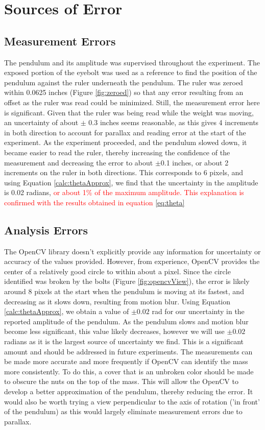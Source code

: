 \documentclass[11pt]{article}
\begin{document}
    \section{Sources of Error}        
        \subsection{Measurement Errors}\label{SourcesOfError:MeasurementErrors}
        The pendulum and its amplitude was supervised throughout the experiment. The exposed portion of the eyebolt was used as a reference to find the position of the pendulum against the ruler underneath the pendulum. The ruler was zeroed within 0.0625 inches (Figure \ref{fig:zeroed}) so that any error resulting from an offset as the ruler was read could be minimized. Still, the measurement error here is significant. Given that the ruler was being read while the weight was moving, an uncertainty of about $\pm$ 0.3 inches seems reasonable, as this gives 4 increments in both direction to account for parallax and reading error at the start of the experiment. As the experiment proceeded, and the pendulum slowed down, it became easier to read the ruler, thereby increasing the confidence of the measurement and decreasing the error to about $\pm$0.1 inches, or about 2 increments on the ruler in both directions. This corresponds to 6 pixels, and using Equation \ref{calc:thetaApprox}, we find that the uncertainty in the amplitude is 0.02 radians, \textcolor{red}{or about 1\% of the maximum amplitude. This explanation is confirmed with the results obtained in equation \ref{eq:theta}}
        
        \subsection{Analysis Errors}\label{SourcesOfError:AnalysisQFactor}
        The OpenCV library doesn't explicitly provide any information for uncertainty or accuracy of the values provided. However, from experience, OpenCV provides  the center of a relatively good circle to within about a pixel. Since the circle identified was broken by the bolts (Figure \ref{fig:opencvView}), the error is likely around 8 pixels at the start when the pendulum is moving at its fastest, and decreasing as it slows down, resulting from motion blur. Using Equation \ref{calc:thetaApprox}, we obtain a value of $\pm 0.02$ rad for our uncertainty in the reported amplitude of the pendulum. As the pendulum slows and motion blur become less significant, this value likely decreases, however we will use $\pm 0.02$ radians as it is the largest source of uncertainty we find. This is a significant amount and should be addressed in future experiments. The measurements can be made more accurate and more frequently if OpenCV can identify the mass more consistently. To do this, a cover that is an unbroken color should be made to obscure the nuts on the top of the mass. This will allow the OpenCV to develop a better approximation of the pendulum, thereby reducing the error. It would also be worth trying a view perpendicular to the axis of rotation ('in front' of the pendulum) as this would largely eliminate measurement errors due to parallax.
\end{document}
